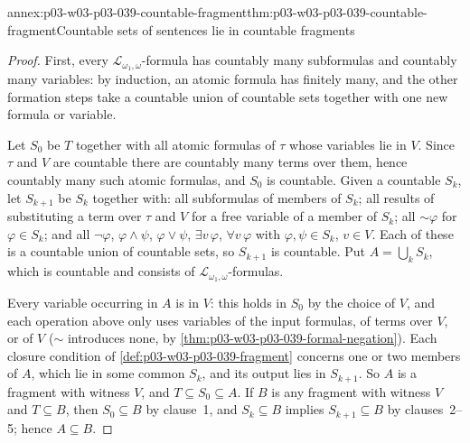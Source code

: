 \begin{annexitem}{annex:p03-w03-p03-039-countable-fragment}{thm:p03-w03-p03-039-countable-fragment}{Countable sets of sentences lie in countable fragments}
\begin{proof}
First, every \(\mathcal L_{\omega_1,\omega}\)-formula has countably many
subformulas and countably many variables: by induction, an atomic formula
has finitely many, and the other formation steps take a countable union of
countable sets together with one new formula or variable.

Let \(S_0\) be \(T\) together with all atomic formulas of \(\tau\) whose
variables lie in \(V\). Since \(\tau\) and \(V\) are countable there are
countably many terms over them, hence countably many such atomic formulas,
and \(S_0\) is countable. Given a countable \(S_k\), let \(S_{k+1}\) be
\(S_k\) together with: all subformulas of members of \(S_k\); all results
of substituting a term over \(\tau\) and \(V\) for a free variable of a member
of \(S_k\); all \({\sim}\varphi\) for \(\varphi\in S_k\); and all
\(\neg\varphi\), \(\varphi\land\psi\), \(\varphi\lor\psi\),
\(\exists v\,\varphi\), \(\forall v\,\varphi\) with \(\varphi,\psi\in S_k\),
\(v\in V\). Each of these is a countable union of countable sets, so
\(S_{k+1}\) is countable. Put \(A=\bigcup_kS_k\), which is countable and
consists of \(\mathcal L_{\omega_1,\omega}\)-formulas.

Every variable occurring in \(A\) is in \(V\): this holds in \(S_0\) by the
choice of \(V\), and each operation above only uses variables of the input
formulas, of terms over \(V\), or of \(V\) (\({\sim}\) introduces none, by
\cref{thm:p03-w03-p03-039-formal-negation}). Each closure condition of
\cref{def:p03-w03-p03-039-fragment} concerns one or two members of \(A\),
which lie in some common \(S_k\), and its output lies in \(S_{k+1}\). So
\(A\) is a fragment with witness \(V\), and \(T\subseteq S_0\subseteq A\).
If \(B\) is any fragment with witness \(V\) and \(T\subseteq B\), then
\(S_0\subseteq B\) by clause~1, and \(S_k\subseteq B\) implies
\(S_{k+1}\subseteq B\) by clauses~2--5; hence \(A\subseteq B\).
\end{proof}
\end{annexitem}

